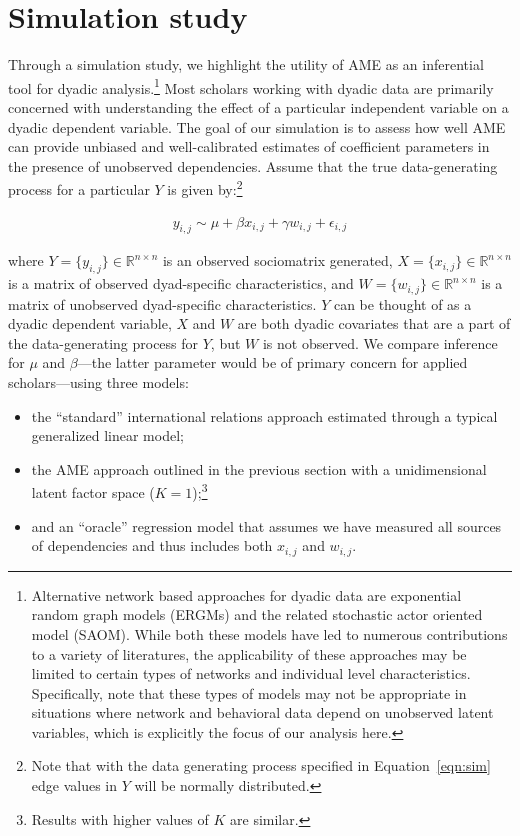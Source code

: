 \section{\textbf{Simulation study}}

Through a simulation study, we highlight the utility of AME as an inferential tool for dyadic analysis.\footnote{Alternative network based approaches for dyadic data are exponential random graph models (ERGMs) and the related stochastic actor oriented model (SAOM). While both these models have led to numerous contributions to a variety of literatures, the applicability of these approaches may be limited to certain types of networks and individual level characteristics. Specifically, \citet{block:etal:2017} note that these types of  models may not be appropriate in situations where network and behavioral data depend on unobserved latent variables, which is explicitly the focus of our analysis here.} Most scholars working with dyadic data are primarily concerned with understanding the effect of a particular independent variable on a dyadic dependent variable. The goal of our simulation is to assess how well AME can provide unbiased and well-calibrated estimates of coefficient parameters in the presence of unobserved dependencies. Assume that the true data-generating process for a particular $Y$ is given by:\footnote{Note that with the data generating process specified in Equation~\ref{eqn:sim} edge values in $Y$ will be normally distributed.} 

\begin{align}
	y_{i,j} \sim  \mu + \beta x_{i,j} + \gamma w_{i,j} + \epsilon_{i,j}
	\label{eqn:sim}
\end{align}

where $Y= \{y_{i,j}\}\in \mathbb R^{n\times n}$ is an observed sociomatrix generated, $X = \{x_{i,j} \} \in \mathbb R^{n \times n}$ is a matrix of observed dyad-specific characteristics, and $W = \{ w_{i,j}\} \in \mathbb R^{n \times n}$ is a matrix of unobserved dyad-specific characteristics. $Y$ can be thought of as a dyadic dependent variable, $X$ and $W$ are both dyadic covariates that are a part of the data-generating process for $Y$, but $W$ is not observed. We compare inference for $\mu$ and $\beta$---the latter parameter would be of primary concern for applied scholars---using three models:

\begin{itemize}
	\item the ``standard'' international relations approach estimated through a typical generalized linear model; 
	\item the AME approach outlined in the previous section with a unidimensional latent factor space ($K=1$);\footnote{Results with higher values of $K$ are similar.}
	\item and an ``oracle'' regression model that assumes we have measured all sources of dependencies and thus includes both $x_{i,j}$ and $w_{i,j}$. 
\end{itemize}

